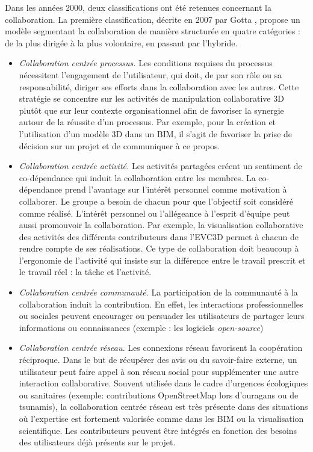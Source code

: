 Dans les années 2000, deux classifications ont été retenues concernant la 
collaboration.
La première classification, décrite en 2007 par Gotta \cite{Gotta2007}, propose 
un modèle segmentant la collaboration de manière structurée en quatre catégories 
: de la plus dirigée à la plus volontaire, en passant par l'hybride.
\begin{itemize}
	\item \textit{Collaboration centrée processus.} Les conditions requises du 
	processus 
	nécessitent l'engagement de l'utilisateur, qui doit, de par son rôle ou sa 
	responsabilité, diriger ses efforts dans la collaboration avec les autres. Cette 
	stratégie se concentre sur les activités de manipulation collaborative 3D plutôt 
	que sur leur contexte organisationnel afin de favoriser la synergie autour de la 
	réussite d'un processus. Par exemple, pour la création et l'utilisation d'un 
	modèle 	3D dans un \gls{BIM}, il s'agit de favoriser la prise de décision sur un 
	projet et de communiquer à ce propos.
	
	\item \textit{Collaboration centrée activité.}
	Les activités partagées créent un sentiment de co-dé\-pendance qui induit la 
	collaboration entre les membres. La co-dépendance prend l'avantage sur l'intérêt personnel comme motivation à collaborer. Le groupe a besoin 
	de chacun pour que l'objectif soit considéré comme réalisé. L'intérêt personnel 
	ou l'allégeance à l'esprit d'équipe peut aussi promouvoir la collaboration. Par 
	exemple, la visualisation collaborative des activités des différents contributeurs 
	dans l'\gls{EVC3D} permet à chacun de rendre compte de ses réalisations. Ce 
	type de collaboration doit beaucoup à l'ergonomie de l'activité qui insiste sur la 
	différence entre le travail prescrit et le travail réel : la tâche et l'activité.
	
	\item \textit{Collaboration centrée communauté.}
	La participation de la communauté à la collaboration induit la contribution. En 
	effet, les interactions professionnelles ou sociales peuvent encourager ou 
	persuader les utilisateurs de partager leurs informations ou connaissances 
	(exemple : les logiciels \textit{open-source})
	
	\item \textit{Collaboration centrée réseau.}
	Les connexions réseau favorisent la coopération réciproque. Dans le but de 
	récupérer des avis ou du savoir-faire externe, un utilisateur peut faire appel à 
	son réseau social pour supplémenter une autre interaction collaborative. 
	Souvent utilisée dans le cadre d'urgences écologiques ou sanitaires (exemple: 
	contributions OpenStreetMap lors d'ouragans ou de tsunamis), la collaboration 
	centrée réseau est très présente dans des situations où l'expertise est 
	fortement 
	valorisée comme dans les \gls{BIM} ou la visualisation scientifique. Les 
	contributeurs peuvent être intégrés en fonction des besoins des utilisateurs déjà 
	présents sur le projet.
\end{itemize}
